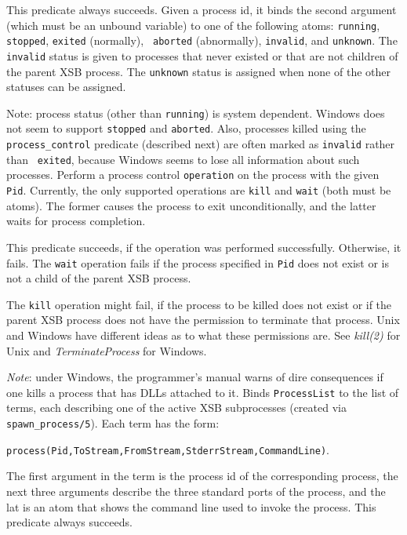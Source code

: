 \begin{description}
    This predicate always succeeds. Given a process id, it binds the second
    argument (which must be an unbound variable) to one of the following
    atoms: {\tt running}, {\tt stopped}, {\tt exited} (normally), {\tt
      aborted} (abnormally), {\tt invalid}, and {\tt unknown}.
    The {\tt invalid} status is given to processes that never existed or
    that are not children of the parent XSB process. The {\tt unknown}
    status is assigned when none of the other statuses can be assigned.

    Note: process status (other than {\tt running}) is system dependent.
    Windows does not seem to support {\tt stopped} and {\tt aborted}.
    Also, processes killed using the \verb|process_control| predicate
    (described next) are often marked as {\tt invalid} rather than {\tt
    exited}, because Windows seems to lose all information about such
    processes.
    Perform a process control {\tt operation} on the process with the given
    {\tt Pid}. 
    Currently, the only supported operations are {\tt kill} and {\tt wait}
    (both must be atoms).
    The former causes the process to exit unconditionally, and the latter
    waits for process completion.

    This predicate succeeds, if the operation was performed successfully.
    Otherwise, it fails. The {\tt wait} operation fails if the process
    specified in {\tt Pid} does not exist or is not a child of the parent
    XSB process. 
    
    The {\tt kill} operation might fail, if the process to be killed does
    not exist or if the parent XSB process does not have the permission to
    terminate that process. Unix and Windows have different ideas as to
    what these permissions are. See \emph{kill(2)} for Unix and
    \emph{TerminateProcess} for Windows.
    
    \emph{Note}: under Windows, the programmer's manual warns of dire
    consequences if one kills a process that has DLLs attached to it.
    Binds {\tt ProcessList} to the list of terms, each describing one of
    the active XSB subprocesses (created via \verb|spawn_process/5|).
    Each term has the form:
    \begin{center}
      \verb|process(Pid,ToStream,FromStream,StderrStream,CommandLine)|. 
    \end{center}
    The first argument in the term is the process id of the corresponding
    process, the next three arguments describe the three standard ports
    of the process, and the lat is an atom that shows the command line used
    to invoke the process.
    This predicate always succeeds.


\end{description}
